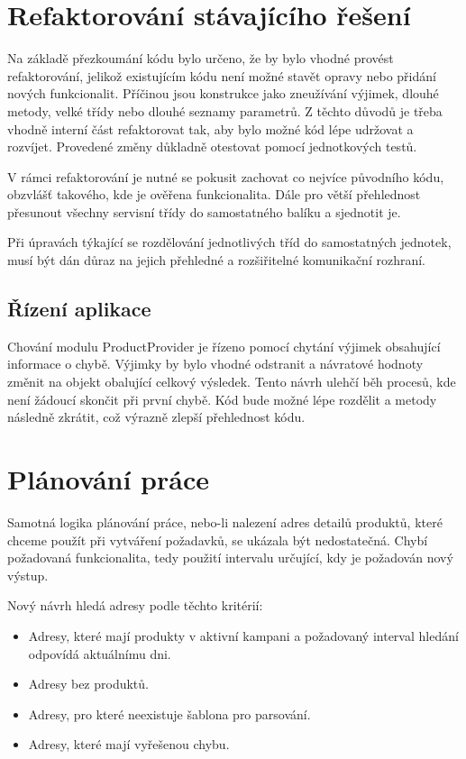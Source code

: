 \documentclass[thesis=B,czech]{FITthesis}[2012/06/26]
\begin{document}
\section{Refaktorování stávajícího řešení}
Na základě přezkoumání kódu bylo určeno, že by bylo vhodné provést refaktorování, jelikož existujícím kódu není možné stavět opravy nebo přidání nových funkcionalit. Příčinou jsou konstrukce jako zneužívání výjimek, dlouhé metody, velké třídy nebo dlouhé seznamy parametrů.
Z těchto důvodů je třeba vhodně interní část refaktorovat tak, aby bylo možné kód lépe udržovat a rozvíjet. Provedené změny důkladně 
otestovat pomocí jednotkových testů.
\par
V rámci refaktorování je nutné se pokusit zachovat co nejvíce původního kódu, obzvlášť takového, kde je ověřena funkcionalita.
Dále pro větší přehlednost přesunout všechny servisní třídy do samostatného balíku a sjednotit je.
\par
Při úpravách týkající se rozdělování jednotlivých tříd do samostatných jednotek, musí být dán důraz na jejich přehledné a rozšiřitelné komunikační rozhraní.

\subsection{Řízení aplikace}
Chování modulu ProductProvider je řízeno pomocí chytání výjimek obsahující informace o chybě. 
Výjimky by bylo vhodné odstranit a návratové hodnoty změnit na objekt obalující celkový výsledek. Tento návrh ulehčí běh procesů, kde není žádoucí
skončit při první chybě. Kód bude možné lépe rozdělit a metody následně zkrátit, což výrazně zlepší přehlednost kódu.

\section{Plánování práce}
Samotná logika plánování práce, nebo-li nalezení adres detailů produktů, které chceme použít při vytváření požadavků, se ukázala být nedostatečná. Chybí požadovaná funkcionalita, tedy použití intervalu určující, kdy je požadován nový výstup.
\par
Nový návrh hledá adresy podle těchto kritérií:

\begin{itemize}
\item Adresy, které mají produkty v aktivní kampani a požadovaný interval hledání odpovídá aktuálnímu dni.
\item Adresy bez produktů.
\item Adresy, pro které neexistuje šablona pro parsování.
\item Adresy, které mají vyřešenou chybu.
\end{itemize}
\end{document}
